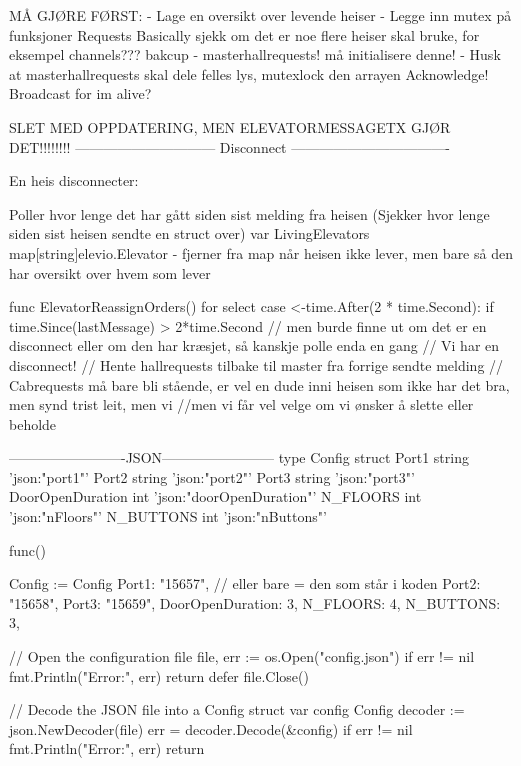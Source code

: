 MÅ GJØRE FØRST:
- Lage en oversikt over levende heiser
- Legge inn mutex på funksjoner
    Requests
    Basically sjekk om det er noe flere heiser skal bruke, for eksempel channels??? bakcup - masterhallrequests! må initialisere denne!
- Husk at masterhallrequests skal dele felles lys, mutexlock den arrayen
Acknowledge!
Broadcast for im alive?

SLET MED OPPDATERING, MEN ELEVATORMESSAGETX GJØR DET!!!!!!!!
------------------------------ Disconnect ----------------------------------

En heis disconnecter:

Poller hvor lenge det har gått siden sist melding fra heisen (Sjekker hvor lenge siden sist heisen sendte en struct over)
var LivingElevators map[string]elevio.Elevator - fjerner fra map når heisen ikke lever, men bare så den har oversikt over hvem som lever

func ElevatorReassignOrders() {
    for {
        select {
        case <-time.After(2 * time.Second):
            if time.Since(lastMessage) > 2*time.Second { // men burde finne ut om det er en disconnect eller om den har kræsjet, så kanskje polle enda en gang
                // Vi har en disconnect!
                // Hente hallrequests tilbake til master fra forrige sendte melding
                // Cabrequests må bare bli stående, er vel en dude inni heisen som ikke har det bra, men synd trist leit, men vi 
                        //men vi får vel velge om vi ønsker å slette eller beholde
            }
        }
    }
}

-------------------------JSON------------------------
type Config struct {
    Port1 string            'json:"port1"'
    Port2 string            'json:"port2"'
    Port3 string            'json:"port3"'
    DoorOpenDuration int   'json:"doorOpenDuration"'
    N_FLOORS int            'json:"nFloors"'
    N_BUTTONS int          'json:"nButtons"'
} 


func(){

Config := Config{
    Port1: "15657", // eller bare = den som står i koden
    Port2: "15658",
    Port3: "15659",
    DoorOpenDuration: 3,
    N_FLOORS: 4,
    N_BUTTONS: 3,
}

    // Open the configuration file
    file, err := os.Open("config.json")
    if err != nil {
        fmt.Println("Error:", err)
        return
    }
    defer file.Close()

    // Decode the JSON file into a Config struct
    var config Config
    decoder := json.NewDecoder(file)
    err = decoder.Decode(&config)
    if err != nil {
        fmt.Println("Error:", err)
        return
    }
}

